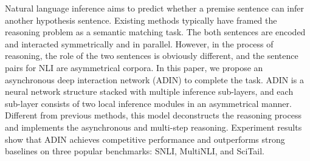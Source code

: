 Natural language inference aims to predict whether a premise sentence can infer another hypothesis sentence. Existing methods typically have framed the reasoning problem as a semantic matching task. The both sentences are encoded and interacted symmetrically and in parallel. However, in the process of reasoning, the role of the two sentences is obviously different, and the sentence pairs for NLI  are asymmetrical corpora. In this paper, we propose an asynchronous deep interaction network (ADIN) to complete the task.  ADIN is a neural network structure stacked with multiple inference sub-layers, and each sub-layer consists of two local inference modules in an asymmetrical manner. Different from previous methods, this model deconstructs the reasoning process and implements the asynchronous and multi-step reasoning. Experiment results show that ADIN achieves competitive performance and outperforms strong baselines on three popular benchmarks:  SNLI, MultiNLI, and SciTail.